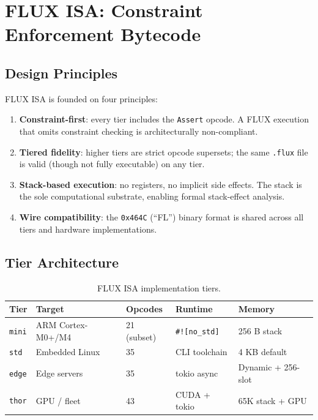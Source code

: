 \documentclass[sigplan,10pt,review]{acmart}
\begin{document}
\section{FLUX ISA: Constraint Enforcement Bytecode}
\label{sec:flux}

\subsection{Design Principles}

FLUX ISA is founded on four principles:

\begin{enumerate}
  \item \textbf{Constraint-first}: every tier includes the \texttt{Assert} opcode.
    A FLUX execution that omits constraint checking is architecturally non-compliant.
  \item \textbf{Tiered fidelity}: higher tiers are strict opcode supersets; the same
    \texttt{.flux} file is valid (though not fully executable) on any tier.
  \item \textbf{Stack-based execution}: no registers, no implicit side effects. The
    stack is the sole computational substrate, enabling formal stack-effect analysis.
  \item \textbf{Wire compatibility}: the \texttt{0x464C} (``FL'') binary format is
    shared across all tiers and hardware implementations.
\end{enumerate}

\subsection{Tier Architecture}

\begin{table}[h]
\centering
\caption{FLUX ISA implementation tiers.}
\label{tab:tiers}
\renewcommand{\arraystretch}{1.2}
\begin{tabular}{lllll}
\toprule
\textbf{Tier} & \textbf{Target} & \textbf{Opcodes} & \textbf{Runtime} & \textbf{Memory} \\
\midrule
\texttt{mini} & ARM Cortex-M0+/M4 & 21 (subset) & \texttt{\#![no\_std]} & 256 B stack \\
\texttt{std}  & Embedded Linux   & 35           & CLI toolchain     & 4 KB default \\
\texttt{edge} & Edge servers     & 35           & tokio async       & Dynamic + 256-slot \\
\texttt{thor} & GPU / fleet      & 43           & CUDA + tokio      & 65K stack + GPU \\
\bottomrule
\end{tabular}
\end{table}
\end{document}
